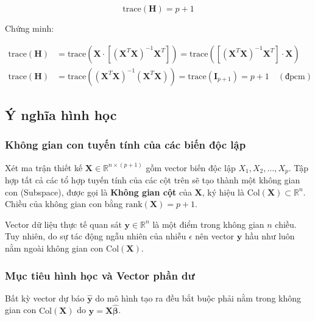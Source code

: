 \begin{equation}
    \text{trace}(\mathbf{H}) = p + 1
\end{equation}

\noindent Chứng minh:

\vspace{-0.5em}

\begin{align}
    \text{trace}(\mathbf{H}) &= \text{trace}\left( \mathbf{X} \cdot \left[(\mathbf{X}^T\mathbf{X})^{-1}\mathbf{X}^T\right] \right) = \text{trace}\left( \left[(\mathbf{X}^T\mathbf{X})^{-1}\mathbf{X}^T\right] \cdot \mathbf{X} \right) \\ 
    \text{trace}(\mathbf{H}) &= \text{trace}\left( (\mathbf{X}^T\mathbf{X})^{-1} (\mathbf{X}^T\mathbf{X}) \right) = \text{trace}(\mathbf{I}_{p+1}) = p + 1 \quad (\text{đpcm})
\end{align}

\subsection{Ý nghĩa hình học}

\subsubsection{Không gian con tuyến tính của các biến độc lập}

Xét ma trận thiết kế $\mathbf{X} \in \mathbb{R}^{n \times (p+1)}$ gồm vector biến độc lập $X_1, X_2, \dots, X_p$. Tập hợp tất cả các tổ hợp tuyến tính của các cột trên sẽ tạo thành một không gian con (Subspace), được gọi là \textbf{Không gian cột} của $\mathbf{X}$, ký hiệu là $\text{Col}(\mathbf{X}) \subset \mathbb{R}^n$. Chiều của không gian con bằng $\text{rank}(\mathbf{X}) = p+1$.

Vector dữ liệu thực tế quan sát $\mathbf{y} \in \mathbb{R}^n$ là một điểm trong không gian $n$ chiều. Tuy nhiên, do sự tác động ngẫu nhiên của nhiễu $\epsilon$ nên vector $\mathbf{y}$ hầu như luôn nằm ngoài không gian con $\text{Col}(\mathbf{X})$.

\subsubsection{Mục tiêu hình học và Vector phần dư}

Bất kỳ vector dự báo $\hat{\mathbf{y}}$ do mô hình tạo ra đều bắt buộc phải nằm trong không gian con $\text{Col}(\mathbf{X})$ do $\hat{\mathbf{y}} = \mathbf{X}\hat{\boldsymbol{\beta}}$.

